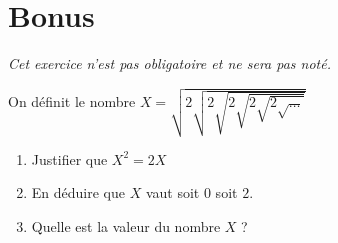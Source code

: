 \documentclass[oneside,12pt]{exam}          %
\begin{document}
\section{Bonus}
\textit{Cet exercice n'est pas obligatoire et ne sera pas noté.}

On définit le nombre $X = \sqrt{2\sqrt{2\sqrt{2\sqrt{2\sqrt{2\sqrt{\ldots}}}}}}$
\begin{enumerate}
	\item Justifier que $X^2 = 2X$
	\item En déduire que $X$ vaut soit $0$ soit $2$.
	\item Quelle est la valeur du nombre $X$ ?
\end{enumerate}
\end{document}
